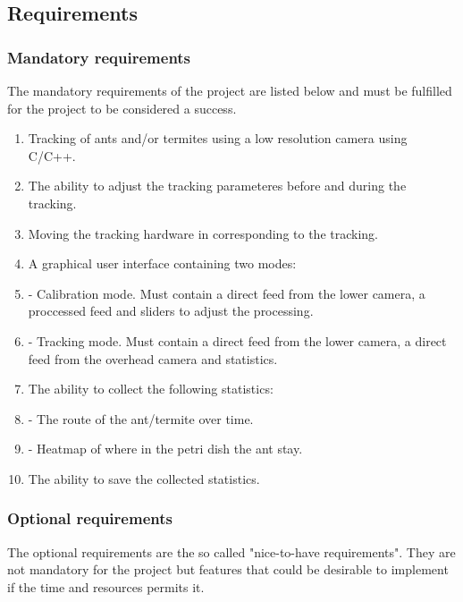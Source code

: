 \subsection{Requirements}
\label{requirements}

\subsubsection{Mandatory requirements}
The mandatory requirements of the project are listed below and must be fulfilled for the project to be considered a success.

\begin{enumerate}
    \item Tracking of ants and/or termites using a low resolution camera using C/C++.
    \item The ability to adjust the tracking parameteres before and during the tracking.
    \item Moving the tracking hardware in corresponding to the tracking.
	\item A graphical user interface containing two modes:
    \item - Calibration mode. Must contain a direct feed from the lower camera, a proccessed feed and sliders to adjust the processing.
    \item - Tracking mode. Must contain a direct feed from the lower camera, a direct feed from the overhead camera and statistics.
    \item The ability to collect the following statistics:
    \item - The route of the ant/termite over time. 
    \item - Heatmap of where in the petri dish the ant stay.
    \item The ability to save the collected statistics.
\end{enumerate}

\subsubsection{Optional requirements}
The optional requirements are the so called "nice-to-have requirements". They are not mandatory for the project but features that could be desirable to implement if the time and resources permits it.

